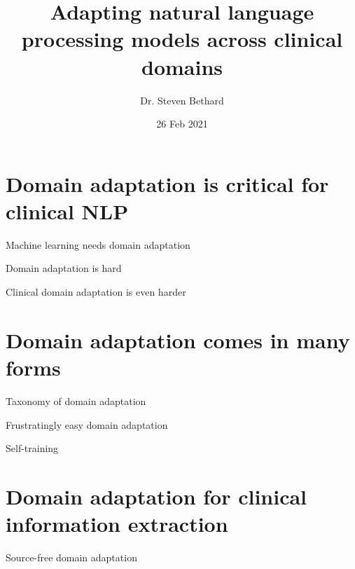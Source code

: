 \documentclass[14pt]{beamer}
\author[Bethard]{Dr. Steven Bethard}
\institute[Arizona]{%
School of Information\\
University of Arizona}
\title{Adapting natural language processing models across clinical domains}
\date[]{26 Feb 2021}
\begin{document}
\begin{frame}
  \titlepage
\end{frame}

\section{Domain adaptation is critical for clinical NLP}

\begin{frame}{Machine learning needs domain adaptation}
\end{frame}

\begin{frame}{Domain adaptation is hard}
\end{frame}

\begin{frame}{Clinical domain adaptation is even harder}
\end{frame}

\section{Domain adaptation comes in many forms}

\begin{frame}{Taxonomy of domain adaptation}
\end{frame}

\begin{frame}{Frustratingly easy domain adaptation}
\end{frame}

\begin{frame}{Self-training}
\end{frame}

\section{Domain adaptation for clinical information extraction}

\begin{frame}{Source-free domain adaptation}
\end{frame}
\end{document}
